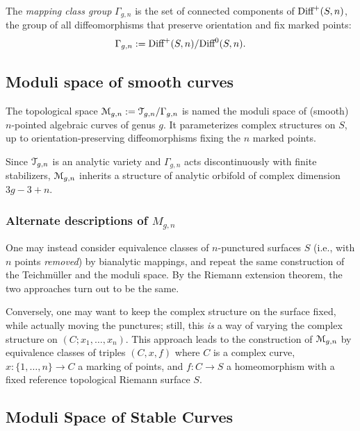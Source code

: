 \begin{definition}\label{dfn:mapping-class-group}
  The \emph{mapping class group} $\Gamma_{g,n}$ is the set of connected
  components of $\textrm{Diff}^+(S, n)$, the group of all diffeomorphisms that
  preserve orientation and fix marked points:
  \begin{equation*}
    \Gamma_{g,n} := \textrm{Diff}^+ (S, n) / \textrm{Diff}^0(S, n).
  \end{equation*}
\end{definition}


\subsection{Moduli space of smooth curves}
\label{sec:Mgn}

\begin{definition}
  The topological space $\mathcal{M}_{g,n} := \mathcal{T}_{g,n} / \Gamma_{g,n}$ is named the
  moduli space of (smooth) $n$-pointed algebraic curves of genus $g$.
  It parameterizes complex structures on $S$, up to
  orientation-preserving diffeomorphisms fixing the $n$ marked points.
\end{definition}
Since $\mathcal{T}_{g,n}$ is an analytic variety and $\Gamma_{g,n}$ acts
discontinuously with finite stabilizers, $\mathcal{M}_{g,n}$ inherits a
structure of analytic orbifold of complex dimension $3g - 3 + n$.

\subsubsection{Alternate descriptions of $M_{g,n}$}
\label{sec:alternate-Mgn}
One may instead consider equivalence classes of $n$-punctured surfaces
$S$ (i.e., with $n$ points \emph{removed}) by bianalytic mappings, and
repeat the same construction of the Teichm\"uller and the moduli space.
By the Riemann extension theorem, the two approaches turn out to be
the same.

Conversely, one may want to keep the complex structure on the surface
fixed, while actually moving the punctures; still, this \emph{is} a
way of varying the complex structure on $(C; x_1, \dots, x_n)$. This
approach leads to the construction of $\mathcal{M}_{g,n}$ by equivalence
classes of triples $(C, x, f)$ where $C$ is a complex curve, $x: \{1,
\ldots, n\} \longrightarrow C$ a marking of points, and $f: C \to S$ a homeomorphism with a
fixed reference topological Riemann surface $S$.


\subsection{Moduli Space of Stable Curves}
\label{sec:moduli-space-stable}


